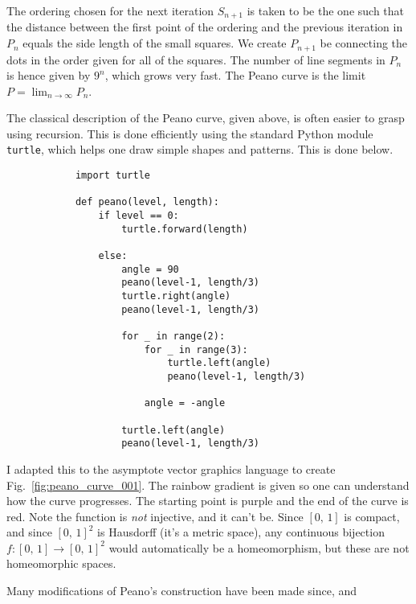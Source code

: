 \documentclass{article}
\theoremstyle{plain}
\theoremstyle{normal}
\begin{document}
        The ordering chosen for the next iteration $S_{n+1}$ is
        taken to be the one such that the distance between the first point of
        the ordering and the previous iteration in $P_{n}$ equals the side
        length of the small squares. We create $P_{n+1}$ be connecting the
        dots in the order given for all of the squares. The number of line
        segments in $P_{n}$ is hence given by $9^{n}$, which grows very fast.
        The Peano curve is the limit $P=\lim_{n\rightarrow\infty}P_{n}$.
        \par\hfill\par
        The classical description of the Peano curve, given above, is often
        easier to grasp using recursion. This is done efficiently using the
        standard Python module \texttt{turtle}, which helps one draw simple
        shapes and patterns. This is done below.
        \begin{verbatim}
            import turtle

            def peano(level, length):
                if level == 0:
                    turtle.forward(length)

                else:
                    angle = 90
                    peano(level-1, length/3)
                    turtle.right(angle)
                    peano(level-1, length/3)

                    for _ in range(2):
                        for _ in range(3):
                            turtle.left(angle)
                            peano(level-1, length/3)

                        angle = -angle

                    turtle.left(angle)
                    peano(level-1, length/3)
        \end{verbatim}
        I adapted this to the asymptote vector graphics language to create
        Fig.~\ref{fig:peano_curve_001}. The rainbow gradient is given so one
        can understand how the curve progresses. The starting point is purple
        and the end of the curve is red. Note the function is \textit{not}
        injective, and it can't be. Since $[0,\,1]$ is compact, and
        since $[0,\,1]^{2}$ is Hausdorff (it's a metric space), any
        continuous bijection $f:[0,\,1]\rightarrow[0,\,1]^{2}$ would
        automatically be a homeomorphism, but these are not homeomorphic
        spaces.
        \par\hfill\par
        Many modifications of Peano's construction have been made since, and
\end{document}
